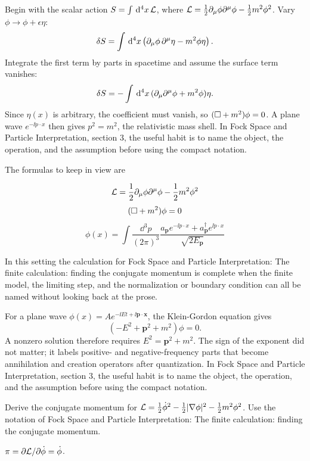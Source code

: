 Begin with the scalar action \(S=\int\,\mathrm d^4x\,\mathcal L\), where \(\mathcal L=\frac12\partial_\mu\phi\partial^\mu\phi-\frac12m^2\phi^2\).  Vary \(\phi\to\phi+\epsilon\eta\):
\[
  \delta S=\int\,\mathrm d^4x\left(\partial_\mu\phi\,\partial^\mu\eta-m^2\phi\eta\right).
\]
Integrate the first term by parts in spacetime and assume the surface term vanishes:
\[
  \delta S=-\int\,\mathrm d^4x\,(\partial_\mu\partial^\mu\phi+m^2\phi)\eta.
\]
Since \(\eta(x)\) is arbitrary, the coefficient must vanish, so \((\Box+m^2)\phi=0\).  A plane wave \(e^{-\ii p\cdot x}\) then gives \(p^2=m^2\), the relativistic mass shell.  In Fock Space and Particle Interpretation, section 3, the useful habit is to name the object, the operation, and the assumption before using the compact notation.

The formulas to keep in view are

\[
  \mathcal L=\frac12\partial_\mu\phi\partial^\mu\phi-\frac12m^2\phi^2
\]
\[
  (\Box+m^2)\phi=0
\]
\[
  \phi(x)=\int\frac{\dd^3p}{(2\pi)^3}\frac{a_{\bm p}e^{-\ii p\cdot x}+a_{\bm p}^\dagger e^{\ii p\cdot x}}{\sqrt{2E_{\bm p}}}
\]

In this setting the calculation for Fock Space and Particle Interpretation: The finite calculation: finding the conjugate momentum is complete when the finite model, the limiting step, and the normalization or boundary condition can all be named without looking back at the prose.




\begin{example}
For a plane wave \(\phi(x)=Ae^{-\ii Et+\ii\bm p\cdot\bm x}\), the Klein-Gordon equation gives
\[
  (-E^2+\bm p^2+m^2)\phi=0.
\]
A nonzero solution therefore requires \(E^2=\bm p^2+m^2\).  The sign of the exponent did not matter; it labels positive- and negative-frequency parts that become annihilation and creation operators after quantization.  In Fock Space and Particle Interpretation, section 3, the useful habit is to name the object, the operation, and the assumption before using the compact notation.
\end{example}



\begin{exercise}
Derive the conjugate momentum for \(\mathcal L=\frac12\dot\phi^2-\frac12|\nabla\phi|^2-\frac12m^2\phi^2\).  Use the notation of Fock Space and Particle Interpretation: The finite calculation: finding the conjugate momentum.
\begin{answer}
\(\pi=\partial\mathcal L/\partial\dot\phi=\dot\phi\).
\end{answer}
\end{exercise}

